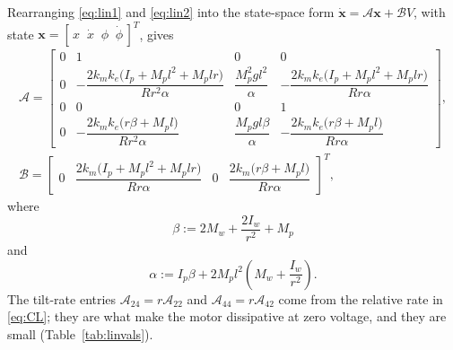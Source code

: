 Rearranging \eqref{eq:lin1} and \eqref{eq:lin2} into the state-space form
$\dot{\mathbf{x}}=\mathcal{A}\mathbf{x}+\mathcal{B}V$, with state
$\mathbf{x}=[\,x\;\;\dot x\;\;\phi\;\;\dot\phi\,]^T$, gives
\begin{equation}\label{eq:linss}
\begin{gathered}
\mathcal{A}=
\begin{bmatrix}
0 & 1 & 0 & 0\\[4pt]
0 & -\dfrac{2k_mk_e\bigl(I_p+M_pl^2+M_plr\bigr)}{Rr^2\alpha}
  & \dfrac{M_p^2gl^2}{\alpha}
  & -\dfrac{2k_mk_e\bigl(I_p+M_pl^2+M_plr\bigr)}{Rr\alpha}\\[8pt]
0 & 0 & 0 & 1\\[4pt]
0 & -\dfrac{2k_mk_e\bigl(r\beta+M_pl\bigr)}{Rr^2\alpha}
  & \dfrac{M_pgl\beta}{\alpha}
  & -\dfrac{2k_mk_e\bigl(r\beta+M_pl\bigr)}{Rr\alpha}
\end{bmatrix},
\\[8pt]
\mathcal{B}=
\begin{bmatrix}
0 & \dfrac{2k_m\bigl(I_p+M_pl^2+M_plr\bigr)}{Rr\alpha} & 0
  & \dfrac{2k_m\bigl(r\beta+M_pl\bigr)}{Rr\alpha}
\end{bmatrix}^T,
\end{gathered}
\end{equation}
where
\begin{equation}\label{eq:beta}
\beta:=2M_w+\frac{2I_w}{r^2}+M_p
\end{equation}
and
\begin{equation}\label{eq:alphadef}
\alpha:=I_p\beta+2M_pl^2\left(M_w+\frac{I_w}{r^2}\right).
\end{equation}
The tilt-rate entries $\mathcal{A}_{24}=r\mathcal{A}_{22}$ and
$\mathcal{A}_{44}=r\mathcal{A}_{42}$ come from the relative rate in
\eqref{eq:CL}; they are what make the motor dissipative at zero voltage, and
they are small (Table~\ref{tab:linvals}).

